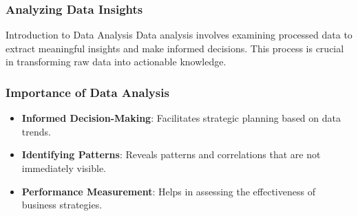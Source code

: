 \documentclass[aspectratio=169]{beamer}
\begin{document}
\begin{frame}[fragile]
    \frametitle{Analyzing Data Insights}
    \begin{block}{Introduction to Data Analysis}
        Data analysis involves examining processed data to extract meaningful insights and make informed decisions. This process is crucial in transforming raw data into actionable knowledge.
    \end{block}
\end{frame}

\begin{frame}[fragile]
    \frametitle{Importance of Data Analysis}
    \begin{itemize}
        \item \textbf{Informed Decision-Making}: Facilitates strategic planning based on data trends.
        \item \textbf{Identifying Patterns}: Reveals patterns and correlations that are not immediately visible.
        \item \textbf{Performance Measurement}: Helps in assessing the effectiveness of business strategies.
    \end{itemize}
\end{frame}
\end{document}
